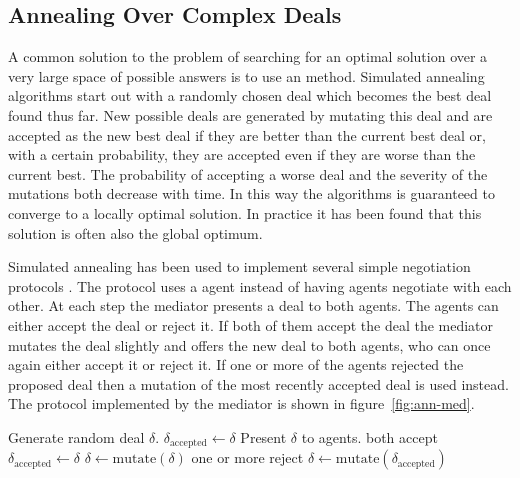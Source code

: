 \subsection{Annealing Over Complex Deals}
\label{sec:anne-over-compl}

A common solution to the problem of searching for an optimal solution
over a very large space of possible answers is to use an
 method. Simulated annealing algorithms start out with a
randomly chosen deal which becomes the best deal found thus far. New
possible deals are generated by mutating this deal and are accepted as
the new best deal if they are better than the current best deal or,
with a certain probability, they are accepted even if they are worse
than the current best. The probability of accepting a worse deal and
the severity of the mutations both decrease with time. In this way the
algorithms is guaranteed to converge to a locally optimal solution. In
practice it has been found that this solution is often also the global
optimum.

Simulated annealing has been used to implement several simple
negotiation protocols \cite{klein03a}. The protocol uses a
 agent instead of having agents negotiate with each
other.  At each step the mediator presents a deal to both agents.  The
agents can either accept the deal or reject it. If both of them accept
the deal the mediator mutates the deal slightly and offers the new
deal to both agents, who can once again either accept it or reject it.
If one or more of the agents rejected the proposed deal then a
mutation of the most recently accepted deal is used instead. The
protocol implemented by the mediator is shown in
figure~\ref{fig:ann-med}.
\begin{SCfigure}
  \begin{minipage}{1.0\linewidth}
\begin{codebox}
  \li Generate random deal $\delta$.   
  \li $\delta_{\mbox{accepted}} \gets \delta$
  \li Present $\delta$ to agents.
  \li \If both accept 
  \li \Then $\delta_{\mbox{accepted}} \leftarrow \delta$
  \li       $\delta \leftarrow \mbox{mutate}(\delta)$
  \li {}
  \End
  \li \If one or more reject 
  \li \Then $\delta \leftarrow \mbox{mutate}(\delta_{\mbox{accepted}})$ 
  \End
  \li {}
\end{codebox}
\end{minipage}
\caption{Procedure used by annealing mediator.}
\label{fig:ann-med}
\end{SCfigure}

